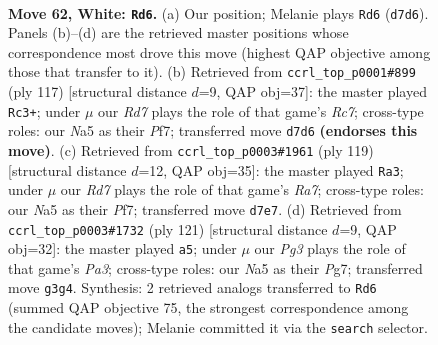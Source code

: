 \documentclass[11pt]{article}
\begin{document}
\clearpage

\begin{figure}[p]\centering
\begin{subfigure}{0.46\textwidth}\centering
\resizebox{\linewidth}{!}{%
\newchessgame
\chessboard[
  setfen={8/3R2p1/5pk1/N6p/3P3P/2r3P1/7K/8 w - - 17 62},
  showmover=false,
  pgfstyle=straightmove, color=movearrow, markmove={d7-d6}
]}
\caption{}
\end{subfigure}\hfill
\begin{subfigure}{0.46\textwidth}\centering
\resizebox{\linewidth}{!}{%
\newchessgame
\chessboard[
  setfen={8/5pk1/R6p/6pP/4P1P1/5K2/2r2P2/8 b - - 12 59},
  showmover=false,
  pgfstyle=straightmove, color=movearrow, markmove={c2-c3}
]}
\caption{}
\end{subfigure}
\\[4pt]
\begin{subfigure}{0.46\textwidth}\centering
\resizebox{\linewidth}{!}{%
\newchessgame
\chessboard[
  setfen={8/5pk1/3R2p1/7p/4P2P/5PK1/r5P1/8 b - - 41 60},
  showmover=false,
  pgfstyle=straightmove, color=movearrow, markmove={a2-a3}
]}
\caption{}
\end{subfigure}\hfill
\begin{subfigure}{0.46\textwidth}\centering
\resizebox{\linewidth}{!}{%
\newchessgame
\chessboard[
  setfen={8/6pk/p3R3/7p/7P/5PK1/r5P1/8 b - - 11 61},
  showmover=false,
  pgfstyle=straightmove, color=movearrow, markmove={a6-a5}
]}
\caption{}
\end{subfigure}
\caption{\textbf{Move 62, White: \texttt{Rd6}.} (a) Our position; Melanie plays \texttt{Rd6} (\texttt{d7d6}). Panels (b)--(d) are the retrieved master positions whose correspondence most drove this move (highest QAP objective among those that transfer to it). (b) Retrieved from \texttt{ccrl\_top\_p0001\#899} (ply 117) [structural distance $d$=9, QAP obj=37]: the master played \texttt{Rc3+}; under $\mu$ our \emph{Rd7} plays the role of that game's \emph{Rc7}; cross-type roles: our \emph{N}a5 as their \emph{P}f7; transferred move \texttt{d7d6} \textbf{(endorses this move)}. (c) Retrieved from \texttt{ccrl\_top\_p0003\#1961} (ply 119) [structural distance $d$=12, QAP obj=35]: the master played \texttt{Ra3}; under $\mu$ our \emph{Rd7} plays the role of that game's \emph{Ra7}; cross-type roles: our \emph{N}a5 as their \emph{P}f7; transferred move \texttt{d7e7}. (d) Retrieved from \texttt{ccrl\_top\_p0003\#1732} (ply 121) [structural distance $d$=9, QAP obj=32]: the master played \texttt{a5}; under $\mu$ our \emph{Pg3} plays the role of that game's \emph{Pa3}; cross-type roles: our \emph{N}a5 as their \emph{P}g7; transferred move \texttt{g3g4}. Synthesis: 2 retrieved analogs transferred to \texttt{Rd6} (summed QAP objective 75, the strongest correspondence among the candidate moves); Melanie committed it via the \texttt{search} selector.}
\label{fig:thought-m122}
\end{figure}
\end{document}
